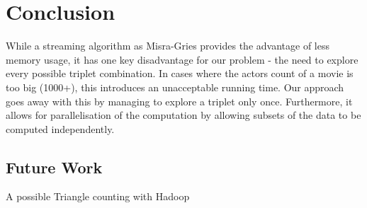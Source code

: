 \section{Conclusion}
\label{Conclusion}

While a streaming algorithm as Misra-Gries provides the advantage of less memory usage, it has one key disadvantage for our problem - the need to explore every possible triplet combination. In cases where the actors count of a movie is too big (1000+), this introduces an unacceptable running time. Our approach goes away with this by managing to explore a triplet only once. Furthermore, it allows for parallelisation of the computation by allowing subsets of the data to be computed independently.


\subsection{Future Work}
A possible Triangle counting with Hadoop